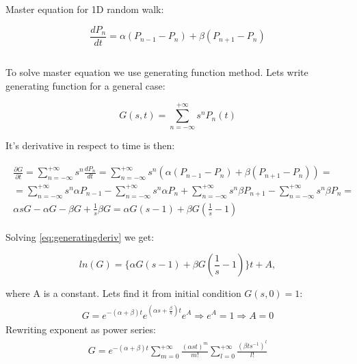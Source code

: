 \documentclass[10pt]{article}
\begin{document}
\subsection{}
Master equation for 1D random walk:

\begin{equation}
\frac{d P_n}{dt} = \alpha(P_{n-1} - P_n) +\beta(P_{n+1} - P_n)
\end{equation}
\subsection{}
To solve master equation we use generating function method. Lets write generating function for a general case:

\begin{equation}\label{eq:genfungen}
G(s,t) = \sum_{n=-\infty}^{+\infty} s^n P_n(t)
\end{equation}

It's derivative in respect to time is then:

\begin{align}
\begin{split}
\frac{\partial G}{\partial t} = \sum_{n=-\infty}^{+\infty} s^n \frac{d P_n}{dt} = \sum_{n=-\infty}^{+\infty} s^n (\alpha(P_{n-1} - P_n) +\beta(P_{n+1} - P_n)) = \\
= \sum_{n=-\infty}^{+\infty} s^n \alpha P_{n-1} - \sum_{n=-\infty}^{+\infty} s^n \alpha P_{n} + \sum_{n=-\infty}^{+\infty} s^n \beta P_{n+1} - \sum_{n=-\infty}^{+\infty} s^n \beta P_{n} = \\
\alpha s G - \alpha G - \beta G + \frac{1}{s}\beta G = \alpha G(s-1) + \beta G(\frac{1}{s} - 1)
\label{eq:generatingderiv}
\end{split}
\end{align}

Solving \ref{eq:generatingderiv} we get:

\begin{equation}
ln(G) = \big\{\alpha G(s-1) + \beta G(\frac{1}{s} - 1)\big\}t + A,
\end{equation}

where A is a constant. Lets find it from initial condition $G(s,0)=1$:
\begin{align}
\begin{split}
G = e^{ -(\alpha + \beta) t} e^{ (\alpha s + \frac{\beta}{s})t} e^A \Rightarrow e^A=1 \Rightarrow A=0
\label{eq:incond}
\end{split}
\end{align}
Rewriting exponent as power series:
\begin{align}
\begin{split}
G = e^{ -(\alpha + \beta) t} \sum_{m=0}^{+\infty} \frac{(\alpha s t)^m}{m!} \sum_{l=0}^{+\infty} \frac{(\beta t s^{-1})^l}{l!}
\label{eq:razloj}
\end{split}
\end{align}
\end{document}
